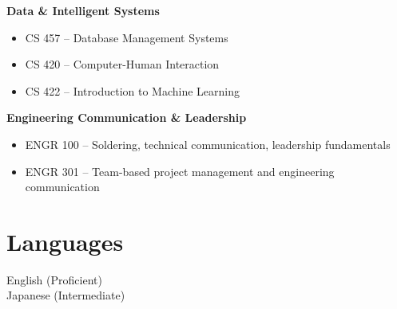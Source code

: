 \documentclass[10pt]{article}
\begin{document}
\textbf{Data \& Intelligent Systems}
    \begin{itemize}
        \item CS 457 -- Database Management Systems
        \item CS 420 -- Computer-Human Interaction
        \item CS 422 -- Introduction to Machine Learning
    \end{itemize}

\textbf{Engineering Communication \& Leadership}
    \begin{itemize}
        \item ENGR 100 -- Soldering, technical communication, leadership fundamentals
        \item ENGR 301 -- Team-based project management and engineering communication
    \end{itemize}

\section*{Languages}
English (Proficient) \\
Japanese (Intermediate)
\end{document}
